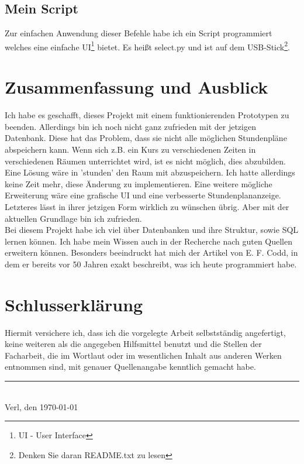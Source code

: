 \documentclass[a4paper, 12pt]{article}
\theoremstyle{plain}
\theoremstyle{definition}
\begin{document}
	\subsection{Mein Script}
	Zur einfachen Anwendung dieser Befehle habe ich ein Script programmiert welches eine einfache UI\footnote{UI - User Interface} bietet. Es heißt select.py und ist auf dem USB-Stick\footnote{Denken Sie daran README.txt zu lesen}.
	\section{Zusammenfassung und Ausblick}
	\label{sec:end}
	Ich habe es geschafft, dieses Projekt mit einem funktionierenden Prototypen zu beenden. Allerdings bin ich noch nicht ganz zufrieden mit der jetzigen Datenbank. Diese hat das Problem, dass sie nicht alle möglichen Stundenpläne abspeichern kann. Wenn sich z.B. ein Kurs zu verschiedenen Zeiten in verschiedenen Räumen unterrichtet wird, ist es nicht möglich, dies abzubilden. Eine Lösung wäre in 'stunden' den Raum mit abzuspeichern. Ich hatte allerdings keine Zeit mehr, diese Änderung zu implementieren. Eine weitere mögliche Erweiterung wäre eine grafische UI und eine verbesserte Stundenplananzeige. Letzteres lässt in ihrer jetzigen Form wirklich zu wünschen übrig. Aber mit der aktuellen Grundlage bin ich zufrieden. \\
	Bei diesem Projekt habe ich viel über Datenbanken und ihre Struktur, sowie SQL lernen können. Ich habe mein Wissen auch in der Recherche nach guten Quellen erweitern können. Besonders beeindruckt hat mich der Artikel von E. F. Codd, in dem er bereits vor 50 Jahren exakt beschreibt, was ich heute programmiert habe.
	
	\newpage
	\printbibliography[heading=bibintoc,title={Literaturverzeichnis}]
	\appendix
	\newpage
	\thispagestyle{empty}
	\section*{Schlusserklärung}
	\label{sec:final}
	Hiermit versichere ich, dass ich die vorgelegte Arbeit selbstständig angefertigt, keine weiteren als die angegeben	 Hilfsmittel benutzt und die Stellen der Facharbeit, die im Wortlaut oder im wesentlichen Inhalt aus anderen Werken entnommen sind, mit genauer Quellenangabe kenntlich gemacht habe.\\[1cm]
	
	\par\noindent\rule{8cm}{0.4pt}\\
	Verl, den \today\\
\end{document}
